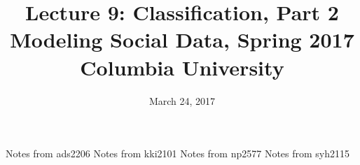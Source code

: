 \documentclass{article}
\title{
Lecture 9: Classification, Part 2 \\  %
Modeling Social Data, Spring 2017 \\   %
Columbia University                    %
}
\date{March 24, 2017}                %
\makeatletter
\let\org@subfile
\renewcommand*{}[1]{%
  \filename@parse{#1}%
  \expandafter
  \graphicspath\expandafter{\expandafter{\filename@area}}%
  \org@subfile{#1}%
}
\makeatother
\begin{document}
\maketitle


\pagebreak \newpage \noindent\Huge{Notes from ads2206} \normalsize \setcounter{section}{0} 
\pagebreak \newpage \noindent\Huge{Notes from kki2101} \normalsize \setcounter{section}{0} 
\pagebreak \newpage \noindent\Huge{Notes from np2577} \normalsize \setcounter{section}{0} 
\pagebreak \newpage \noindent\Huge{Notes from syh2115} \normalsize \setcounter{section}{0} 
\end{document}
